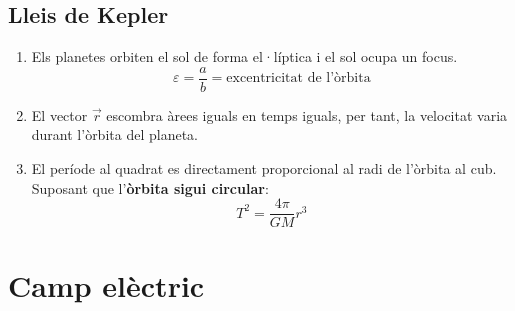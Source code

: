 \pagebreak

\subsection{Lleis de Kepler}
\label{sub:lleis_de_kepler}

\begin{enumerate}
    \item Els planetes orbiten el sol de forma el·líptica i el sol ocupa un focus.
        \begin{equation}
            \varepsilon = \frac{a}{b} = \text{excentricitat de l'òrbita}
        \end{equation}
    \item El vector $\vec{r}$ escombra àrees iguals en temps iguals, per tant, la velocitat varia durant l'òrbita del planeta. 
    \item El període al quadrat es directament proporcional al radi de l'òrbita al cub. Suposant que l'\textbf{òrbita sigui circular}:
        \vspace{1cm}
        \begin{equation}
            T^2 = \frac{4\pi}{GM}r^3
        \end{equation}
\end{enumerate}

\vspace{1cm}

\begin{center}
\end{center}

\section{Camp elèctric}
\label{sec:camp_electric}

